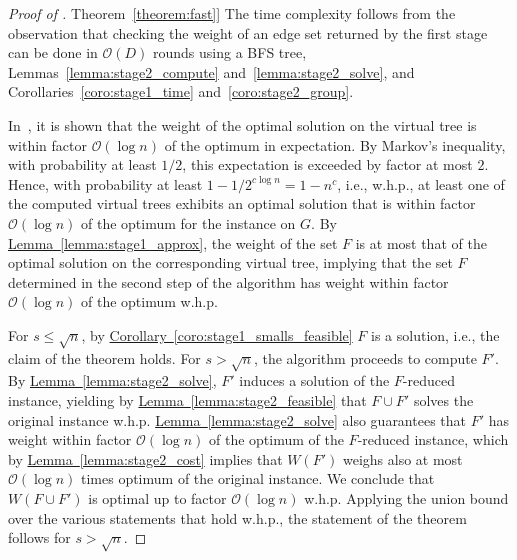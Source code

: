\documentclass[letterpaper,11pt]{article}
\newcommand{\namedref}[2]{\hyperref[#2]{#1~\ref*{#2}}}
\newcommand{\theoremref}[1]{\namedref{Theorem}{#1}}
\newcommand{\lemmaref}[1]{\namedref{Lemma}{#1}}
\newcommand{\corollaryref}[1]{\namedref{Corollary}{#1}}
\newcommand{\BO}{\mathcal{O}}
\begin{document}
\begin{proof}[Proof of \theoremref{theorem:fast}]
The time complexity follows from the observation that checking the weight of an
edge set returned by the first stage can be done in $\BO(D)$ rounds using a BFS
tree, Lemmas~\ref{lemma:stage2_compute} and~\ref{lemma:stage2_solve}, and
Corollaries~\ref{coro:stage1_time} and~\ref{coro:stage2_group}.

In~\cite{KKMPT-12}, it is shown that the weight of the optimal solution on the
virtual tree is within factor $\BO(\log n)$ of the optimum in expectation. By
Markov's inequality, with probability at least $1/2$, this expectation is
exceeded by factor at most $2$. Hence, with probability at least $1-1/2^{c\log
n}=1-n^c$, i.e., w.h.p., at least one of the computed virtual trees exhibits an
optimal solution that is within factor $\BO(\log n)$ of the optimum for the
instance on $G$. By \lemmaref{lemma:stage1_approx}, the weight of the set $F$ is
at most that of the optimal solution on the corresponding virtual tree, implying
that the set $F$ determined in the second step of the algorithm has weight
within factor $\BO(\log n)$ of the optimum w.h.p.

For $s\leq \sqrt{n}$, by \corollaryref{coro:stage1_smalls_feasible} $F$ is a
solution, i.e., the claim of the theorem holds. For $s>\sqrt{n}$, the algorithm
proceeds to compute $F'$. By \lemmaref{lemma:stage2_solve}, $F'$ induces a
solution of the $F$-reduced instance, yielding by
\lemmaref{lemma:stage2_feasible} that $F\cup F'$ solves the original instance
w.h.p. \lemmaref{lemma:stage2_solve} also guarantees that $F'$ has weight within
factor $\BO(\log n)$ of the optimum of the $F$-reduced instance, which by
\lemmaref{lemma:stage2_cost} implies that $W(F')$ weighs also at most $\BO(\log
n)$ times optimum of the original instance. We conclude that $W(F\cup F')$ is
optimal up to factor $\BO(\log n)$ w.h.p. Applying the union bound over the
various statements that hold w.h.p., the statement of the theorem follows for
$s>\sqrt{n}$.
\end{proof}
\end{document}
